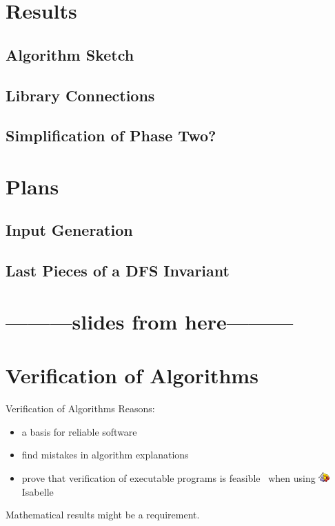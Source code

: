 \documentclass[%
	sans,
	12pt,
]{beamer}
\begin{document}
\section{Results}
    \subsection{Algorithm Sketch} %
    \subsection{Library Connections}
    \subsection{Simplification of Phase Two?}%
\section{Plans}
    \subsection{Input Generation} %
    \subsection{Last Pieces of a DFS Invariant}
    

\section{---------slides from here---------}
\section{Verification of Algorithms}
\begin{frame}{Verification of Algorithms}
Reasons:
\begin{itemize}
	\item a basis for reliable software\pause
	\item find mistakes in algorithm explanations\pause
	\item prove that verification of executable programs
	is feasible\ %
	 when using \includegraphics[height=1em]{isabelle.pdf}Isabelle\pause
\end{itemize}
Mathematical results might be a requirement.
\end{frame}
\end{document}
